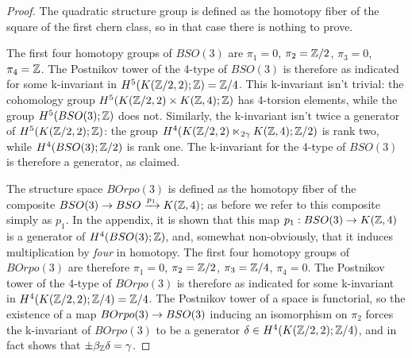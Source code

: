 \documentclass{amsart}
\begin{document}
\begin{proof}
The quadratic structure group is defined as the homotopy fiber of the square of the first chern class, so in that case there is nothing to prove.

The first four homotopy groups of $BSO(3)$ are $\pi_1 = 0$, $\pi_2 = \mathbb Z/2$, $\pi_3 = 0$, $\pi_4 = \mathbb Z$.  The Postnikov tower of the 4-type of $BSO(3)$ is therefore as indicated for some k-invariant in $H^5(K(\mathbb Z/2,2);\mathbb Z) = \mathbb Z/4$.  This k-invariant isn't trivial: the cohomology group $H^5(K(\mathbb Z/2,2) \times K(\mathbb Z,4);\mathbb Z)$ has 4-torsion elements, while the group $H^5(BSO(3);\mathbb Z)$ does not.  Similarly, the k-invariant isn't twice a generator of $H^5(K(\mathbb Z/2,2);\mathbb Z)$: the group $H^4(K(\mathbb Z/2,2) \ltimes_{2\gamma} K(\mathbb Z,4);\mathbb Z/2)$ is rank two, while $H^4(BSO(3);\mathbb Z/2)$ is rank one.  The k-invariant for the 4-type of $BSO(3)$ is therefore a generator, as claimed.

The structure space $BOrpo(3)$ is defined as the homotopy fiber of the composite $BSO(3) \rightarrow BSO \xrightarrow{p_1} K(\mathbb Z,4)$; as before we refer to this composite simply as $p_1$.  In the appendix, it is shown that this map $p_1: BSO(3) \rightarrow K(\mathbb Z,4)$ is a generator of $H^4(BSO(3);\mathbb Z)$, and, somewhat non-obviously, that it induces multiplication by \emph{four} in homotopy.  The first four homotopy groups of $BOrpo(3)$ are therefore $\pi_1 = 0$, $\pi_2 = \mathbb Z/2$, $\pi_3 = \mathbb Z/4$, $\pi_4 = 0$.  The Postnikov tower of the 4-type of $BOrpo(3)$ is therefore as indicated for some k-invariant in $H^4(K(\mathbb Z/2,2);\mathbb Z/4) = \mathbb Z/4$.  The Postnikov tower of a space is functorial, so the existence of a map $BOrpo(3) \rightarrow BSO(3)$ inducing an isomorphism on $\pi_2$ forces the k-invariant of $BOrpo(3)$ to be a generator $\delta \in H^4(K(\mathbb Z/2,2);\mathbb Z/4)$, and in fact shows that $\pm \beta_{\mathbb Z} \delta = \gamma$. 
\end{proof}
\end{document}
